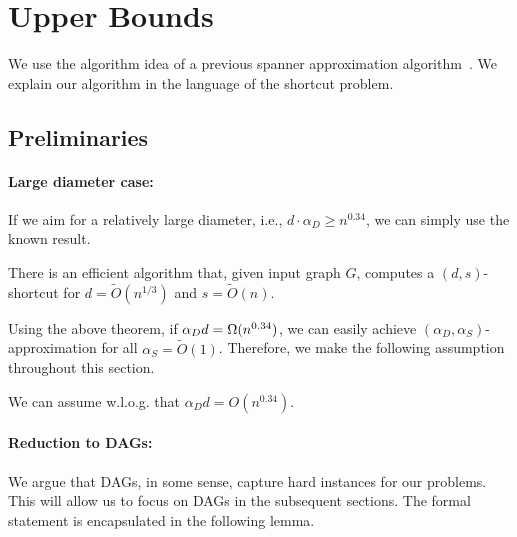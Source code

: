 
\section{Upper Bounds}\label{sec:upperbound}
We use the algorithm idea of a previous spanner approximation algorithm~\cite{BermanBMRY13}. We explain our algorithm in the language of the shortcut problem. 

\subsection{Preliminaries}



\paragraph{Large diameter case:} If we aim for a relatively large diameter, i.e., $d \cdot \alpha_D \geq n^{0.34}$, we can simply use the known result. 

\begin{theorem}
There is an efficient algorithm that, given input graph $G$, computes a $(d,s)$-shortcut for $d = \tilde{O}(n^{1/3})$ and $s = \tilde{O}(n)$.    
\end{theorem}

Using the above theorem, if $\alpha_D{}d=\Omega(n^{0.34})$, we can easily achieve $(\alpha_D, \alpha_S)$-approximation for all $\alpha_S = \tilde{O}(1)$. 
Therefore, we make the following assumption throughout this section. 

\begin{remark}\label{rem:assumption}
We can assume w.l.o.g. that $\alpha_D d = O(n^{0.34})$. 
\end{remark}

\paragraph{Reduction to DAGs:} We argue that DAGs, in some sense, capture hard instances for our problems. This will allow us to focus on DAGs in the subsequent sections.
The formal statement is encapsulated in the following lemma. 


